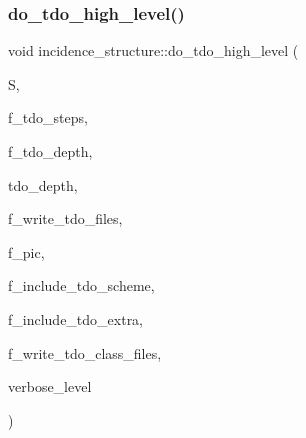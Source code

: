 \subsubsection{\texorpdfstring{do\+\_\+tdo\+\_\+high\+\_\+level()}{do\_tdo\_high\_level()}}
{\footnotesize\ttfamily void incidence\+\_\+structure\+::do\+\_\+tdo\+\_\+high\+\_\+level (\begin{DoxyParamCaption}\item[{\mbox{\hyperlink{classpartitionstack}{partitionstack}} \&}]{S,  }\item[{\mbox{\hyperlink{galois_8h_a09fddde158a3a20bd2dcadb609de11dc}{I\+NT}}}]{f\+\_\+tdo\+\_\+steps,  }\item[{\mbox{\hyperlink{galois_8h_a09fddde158a3a20bd2dcadb609de11dc}{I\+NT}}}]{f\+\_\+tdo\+\_\+depth,  }\item[{\mbox{\hyperlink{galois_8h_a09fddde158a3a20bd2dcadb609de11dc}{I\+NT}}}]{tdo\+\_\+depth,  }\item[{\mbox{\hyperlink{galois_8h_a09fddde158a3a20bd2dcadb609de11dc}{I\+NT}}}]{f\+\_\+write\+\_\+tdo\+\_\+files,  }\item[{\mbox{\hyperlink{galois_8h_a09fddde158a3a20bd2dcadb609de11dc}{I\+NT}}}]{f\+\_\+pic,  }\item[{\mbox{\hyperlink{galois_8h_a09fddde158a3a20bd2dcadb609de11dc}{I\+NT}}}]{f\+\_\+include\+\_\+tdo\+\_\+scheme,  }\item[{\mbox{\hyperlink{galois_8h_a09fddde158a3a20bd2dcadb609de11dc}{I\+NT}}}]{f\+\_\+include\+\_\+tdo\+\_\+extra,  }\item[{\mbox{\hyperlink{galois_8h_a09fddde158a3a20bd2dcadb609de11dc}{I\+NT}}}]{f\+\_\+write\+\_\+tdo\+\_\+class\+\_\+files,  }\item[{\mbox{\hyperlink{galois_8h_a09fddde158a3a20bd2dcadb609de11dc}{I\+NT}}}]{verbose\+\_\+level }\end{DoxyParamCaption})}

\mbox{\label{classincidence__structure_ace4567a2b4174d77f15e8a52fb72b1e3}} 
